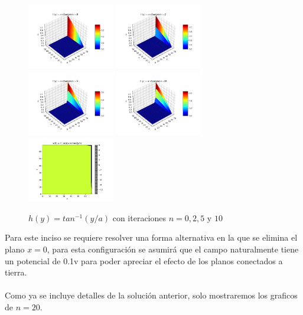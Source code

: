 \documentclass[10pt,journal,compsoc]{IEEEtran}
\begin{document}
\begin{figure}
  \centering
  \includegraphics[width=1.5in]{images/arctan-n0}
  \includegraphics[width=1.5in]{images/arctan-n2}
  \includegraphics[width=1.5in]{images/arctan-n5}
  \includegraphics[width=1.5in]{images/arctan-n10}
  \includegraphics[width=1.5in]{images/arctan-density}
  \caption{\(h(y) = tan^{-1}(y/a)\) con iteraciones \(n = 0, 2, 5 \text{ y } 10\)}
  \label{arctan-iterations}
\end{figure}

Para este inciso se requiere resolver una forma alternativa en la que se elimina
el plano \(x=0\), para esta configuración se asumirá que el campo naturalmente tiene un
potencial de 0.1v para poder apreciar el efecto de los planos conectados a tierra.
\\\\
Como ya se incluye detalles de la solución anterior, solo mostraremos los graficos de \(n=20\).
\end{document}

